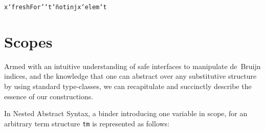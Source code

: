 \documentclass[9pt,preprint,authoryear]{sigplanconf}
\begin{document}
{{{}\vphantom{$\{$}}}\textcolor[rgb]{0,0,0.80}{\texttt{x}}\textcolor[rgb]{0,0,0.80}{\texttt{\mbox{\hspace{0.50em}}}}\textcolor[rgb]{0,0,0.80}{\texttt{{`}freshFor{'}{`}}}\textcolor[rgb]{0,0,0.80}{\texttt{\mbox{\hspace{0.50em}}}}\textcolor[rgb]{0,0,0.80}{\texttt{t}}\textcolor[rgb]{0,0,0.80}{\texttt{\mbox{\hspace{0.50em}}}}\textcolor[cmyk]{0,0.65,0.99,0}{\texttt{{\char `\=}}}\textcolor[rgb]{0,0,0.80}{\texttt{\mbox{\hspace{0.50em}}}}\textcolor[rgb]{0,0,0.80}{\texttt{not}}\textcolor[rgb]{0,0,0.80}{\texttt{\mbox{\hspace{0.50em}}}}\textcolor[cmyk]{0,0.65,0.99,0}{\texttt{\makebox[1.22ex][l]{$ {(} $}}}\textcolor[rgb]{0,0,0.80}{\texttt{inj}}\textcolor[rgb]{0,0,0.80}{\texttt{\mbox{\hspace{0.50em}}}}\textcolor[rgb]{0,0,0.80}{\texttt{x}}\textcolor[rgb]{0,0,0.80}{\texttt{\mbox{\hspace{0.50em}}}}\textcolor[rgb]{0,0,0.80}{\texttt{{`}elem{`}}}\textcolor[rgb]{0,0,0.80}{\texttt{\mbox{\hspace{0.50em}}}}\textcolor[rgb]{0,0,0.80}{\texttt{t}}\textcolor[cmyk]{0,0.65,0.99,0}{\texttt{\makebox[1.22ex][r]{$ {)} $}}}\textcolor[rgb]{0,0,0.80}{\texttt{{\nopagebreak \newline%
}\vphantom{$\{$}}}%


\section{Scopes\label{scopesSec}}

%
  Armed with an intuitive understanding of safe interfaces to manipulate de{~}Bruijn indices, 
  and the knowledge that one can abstract over any 
  substitutive structure by using standard type-classes, we can recapitulate and succinctly describe
  the essence of our constructions.%


%
In Nested Abstract Syntax, a binder introducing one variable in scope, for an arbitrary term structure \textcolor[rgb]{0,0,0.80}{\texttt{tm}}    is represented as follows{:}%


{\nopagebreak }
\end{document}
